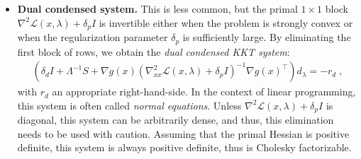\documentclass{article}
\begin{document}
\begin{itemize}[leftmargin=*,itemsep=0pt,parsep=0pt,partopsep=0pt]
\item \textbf{Dual condensed system.}
This is less common, but the primal $1 \times 1$ block $\nabla^2 \mathcal{L}(x,\lambda) + \delta_p I$ is invertible either when the problem is strongly convex or when the regularization parameter $\delta_p$ is sufficiently large.
By eliminating the first block of rows, we obtain the \emph{dual condensed KKT system}:
\begin{align}\label{eqn:kkt_dual}
  \left(\delta_d I + \Lambda^{-1}S + \nabla g(x)\left(\nabla_{x x}^2 \mathcal{L}(x,\lambda) + \delta_p I\right)^{-1} \nabla g(x)^\top\right)
  d_\lambda = - r_d \; ,
\end{align}
with $r_d$ an appropriate right-hand-side.
In the context of linear programming, this system is often called \emph{normal equations}.
Unless $\nabla^2 \mathcal{L}(x,\lambda) + \delta_p I$ is diagonal, this system can be arbitrarily dense, and thus, this elimination needs to be used with caution. Assuming that the primal Hessian is positive definite, this system is always positive definite, thus is Cholesky factorizable.
\end{itemize}
\end{document}

